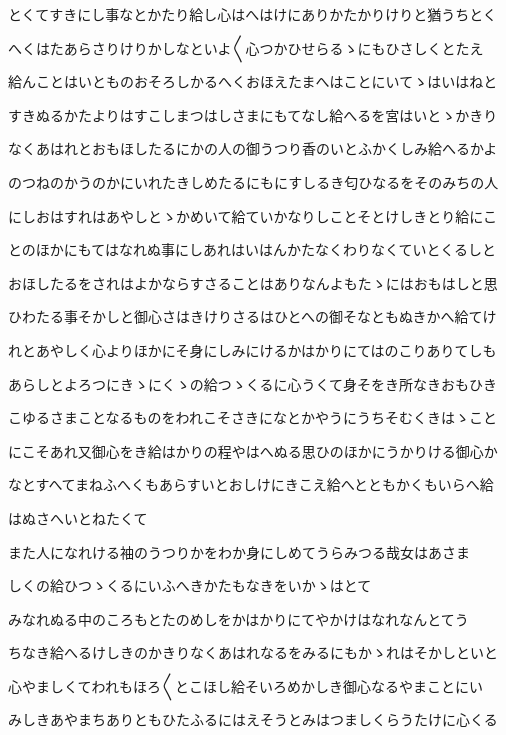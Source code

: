 \documentclass[a4paper,11pt,landscape]{ltjtarticle}
\begin{document}
とくてすきにし事なとかたり給し心はへはけにありかたかりけりと猶うちとく
\par\medskip
へくはたあらさりけりかしなといよ〱心つかひせらるゝにもひさしくとたえ
\par\medskip
給んことはいとものおそろしかるへくおほえたまへはことにいてゝはいはねと
\par\medskip
すきぬるかたよりはすこしまつはしさまにもてなし給へるを宮はいとゝかきり
\par\medskip
なくあはれとおもほしたるにかの人の御うつり香のいとふかくしみ給へるかよ
\par\medskip
のつねのかうのかにいれたきしめたるにもにすしるき匂ひなるをそのみちの人
\par\medskip
にしおはすれはあやしとゝかめいて給ていかなりしことそとけしきとり給にこ
\par\medskip
とのほかにもてはなれぬ事にしあれはいはんかたなくわりなくていとくるしと
\par\medskip
おほしたるをされはよかならすさることはありなんよもたゝにはおもはしと思
\par\medskip
ひわたる事そかしと御心さはきけりさるはひとへの御そなともぬきかへ給てけ
\par\medskip
れとあやしく心よりほかにそ身にしみにけるかはかりにてはのこりありてしも
\par\medskip
あらしとよろつにきゝにくゝの給つゝくるに心うくて身そをき所なきおもひき
\par\medskip
こゆるさまことなるものをわれこそさきになとかやうにうちそむくきはゝこと
\par\medskip
にこそあれ又御心をき給はかりの程やはへぬる思ひのほかにうかりける御心か
\par\medskip
なとすへてまねふへくもあらすいとおしけにきこえ給へとともかくもいらへ給
\par\medskip
はぬさへいとねたくて
\par\medskip
また人になれける袖のうつりかをわか身にしめてうらみつる哉女はあさま
\par\medskip
しくの給ひつゝくるにいふへきかたもなきをいかゝはとて
\par\medskip
みなれぬる中のころもとたのめしをかはかりにてやかけはなれなんとてう
\par\medskip
ちなき給へるけしきのかきりなくあはれなるをみるにもかゝれはそかしといと
\par\medskip
心やましくてわれもほろ〱とこほし給そいろめかしき御心なるやまことにい
\par\medskip
みしきあやまちありともひたふるにはえそうとみはつましくらうたけに心くる
\par\medskip
\end{document}

